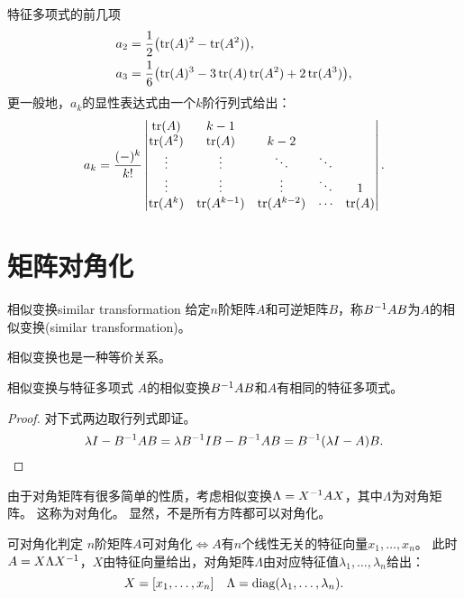 \begin{example}
	{特征多项式的前几项}{}
	\begin{subequations}
		\begin{align}
			a_2&=\frac12\bigl(\operatorname{tr}(A)^2-\operatorname{tr}(A^2)\bigr),\\
			a_3&=\frac16\bigl(\operatorname{tr}(A)^3-3\operatorname{tr}(A)\operatorname{tr}(A^2)+2\operatorname{tr}(A^3)\bigr),
		\end{align}
	\end{subequations}
	更一般地，$a_k$的显性表达式由一个$k$阶行列式给出：
	\begin{equation}
		a_k=\frac{(-)^k}{k!}\begin{vmatrix}
			\operatorname{tr}(A)&k-1\\
			\operatorname{tr}(A^2)&\operatorname{tr}(A)&k-2\\
			\vdots&\vdots&\ddots&\ddots\\
			\vdots&\vdots&\vdots&\ddots&1\\
			\operatorname{tr}(A^k)&\operatorname{tr}(A^{k-1})&\operatorname{tr}(A^{k-2})&\cdots&\operatorname{tr}(A)
		\end{vmatrix}.
	\end{equation}
\end{example}

\section{矩阵对角化}

\begin{definition}
	{相似变换}{similar transformation}
	给定$n$阶矩阵$A$和可逆矩阵$B$，称$B^{-1} AB$为$A$的相似变换(similar transformation)。
\end{definition}

\begin{corollary}
	相似变换也是一种等价关系。
\end{corollary}

\begin{theorem}{相似变换与特征多项式}{}
	$A$的相似变换$B^{-1} AB$和$A$有相同的特征多项式。
\end{theorem}
\begin{proof} 
	对下式两边取行列式即证。
	\[
		\lambda I-B^{-1} AB=\lambda B^{-1} IB-B^{-1} AB=B^{-1}(\lambda I-A)B.
		\qedhere
	\]
\end{proof}

由于对角矩阵有很多简单的性质，考虑相似变换$\Lambda=X^{-1} AX$，其中$\Lambda$为对角矩阵。
这称为对角化。
显然，不是所有方阵都可以对角化。

\begin{theorem}{可对角化判定}{}
	$n$阶矩阵$A$可对角化$\iff A$有$n$个线性无关的特征向量$x_1,\ldots,x_n$。
	\tcblower
	此时$A=X\Lambda X^{-1}$，$X$由特征向量给出，对角矩阵$\Lambda$由对应特征值$\lambda_1,\ldots,\lambda_n$给出：
	\begin{equation}
		X=[x_1,\ldots,x_n]
		\quad
	\Lambda=\operatorname{diag}(\lambda_1,\ldots,\lambda_n).
	\end{equation}
\end{theorem}

